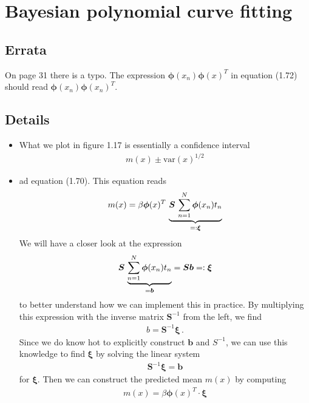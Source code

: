 \documentclass[11pt, DINA4, fleqn]{amsart}
\begin{document}
\section{Bayesian polynomial curve fitting}

\subsection{Errata}
On page 31 there is a typo. The expression
$\bm{\phi}(x_n)\bm{\phi}(x)^T$ in equation (1.72) should read $\bm{\phi}(x_n)\bm{\phi}(x_n)^T$.

\subsection{Details}
\begin{itemize}
	\item What we plot in figure 1.17 is essentially a confidence interval
	\begin{align}
	m(x) \pm \text{var}(x)^{1/2}
	\end{align}
	
	\item ad equation (1.70). This equation reads
	\begin{align}
	m(x) = \beta \bm{\phi}(x)^T \, \underbrace{\bm{S} \, \sum\displaylimits_{n=1}^{N}\bm{\phi}(x_n)t_n}_{=:\bm{\xi}}
	\end{align}
	We will have a closer look at the expression
	\begin{align}
	\bm{S} \, \underbrace{\sum\displaylimits_{n=1}^{N}\bm{\phi}(x_n)t_n}_{=\bm{b}}
	= \bm{S} \bm{b} =: \bm{\xi}
	\end{align}
	to better understand how we can implement this in practice. By multiplying this expression with the inverse matrix $\bm{S}^{-1}$ from the left, we find
	\begin{align}
	b = \bm{S}^{-1}\bm{\xi} \, .
	\end{align}
	Since we do know hot to explicitly construct $\bm{b}$ and $S^{-1}$, we can use this knowledge to find $\bm{\xi}$ by solving the linear system
	\begin{align}
	\bm{S}^{-1} \bm{\xi} = \bm{b}
	\end{align}
	for $\bm{\xi}$. Then we can construct the predicted mean $m(x)$ by computing
	\begin{align}
	m(x) = \beta\bm{\phi}(x)^T \cdot \bm{\xi}
	\end{align}
	

\end{itemize}
\end{document}
